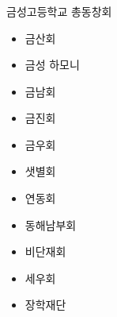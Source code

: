 \documentclass[aspectratio=1610,20pt,xcolor=pdftex,dvipsnames,table,handout]{beamer}
\begin{document}
		\begin{frame} [t,plain]
		\frametitle{ }
			\begin{block} {금성고등학교 총동창회 }
			\setlength{\leftmargini}{2em}			
			\begin{itemize}
				\item 금산회\hrulefill
				\item 금성 하모니\hrulefill
				\item 금남회
				\item 금진회
				\item 금우회
				\item 샛별회
				\item 연동회
				\item 동해남부회
				\item 비단재회
				\item 세우회
				\item 장학재단



			\end{itemize}
			\end{block}						
		\end{frame}						
\end{document}
